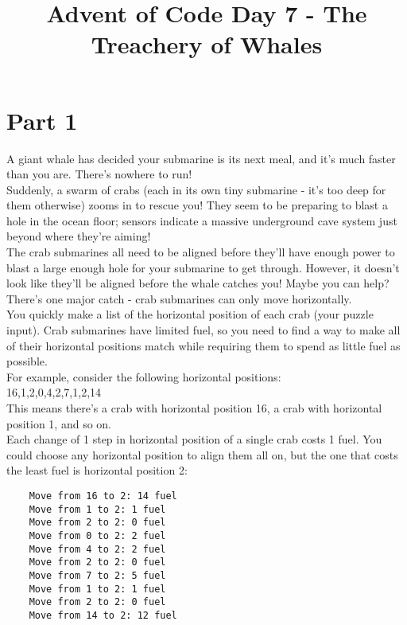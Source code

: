 \documentclass{article}
\title{Advent of Code Day 7 - The Treachery of Whales}
\begin{document}
\maketitle
\setlength{\parindent}{0ex}

\section{Part 1}
A giant whale has decided your submarine is its next meal, and it's much faster
than you are. There's nowhere to run!\\

Suddenly, a swarm of crabs (each in its own tiny submarine - it's too deep for
them otherwise) zooms in to rescue you! They seem to be preparing to blast a
hole in the ocean floor; sensors indicate a massive underground cave system just
beyond where they're aiming!\\

The crab submarines all need to be aligned before they'll have enough power to
blast a large enough hole for your submarine to get through. However, it doesn't
look like they'll be aligned before the whale catches you! Maybe you can help?\\

There's one major catch - crab submarines can only move horizontally.\\

You quickly make a list of the horizontal position of each crab (your puzzle
input). Crab submarines have limited fuel, so you need to find a way to make all
of their horizontal positions match while requiring them to spend as little fuel
as possible.\\

For example, consider the following horizontal positions:\\

16,1,2,0,4,2,7,1,2,14\\

This means there's a crab with horizontal position 16, a crab with horizontal
position 1, and so on.\\

Each change of 1 step in horizontal position of a single crab costs 1 fuel. You
could choose any horizontal position to align them all on, but the one that
costs the least fuel is horizontal position 2:\\
\begin{verbatim}
    Move from 16 to 2: 14 fuel
    Move from 1 to 2: 1 fuel
    Move from 2 to 2: 0 fuel
    Move from 0 to 2: 2 fuel
    Move from 4 to 2: 2 fuel
    Move from 2 to 2: 0 fuel
    Move from 7 to 2: 5 fuel
    Move from 1 to 2: 1 fuel
    Move from 2 to 2: 0 fuel
    Move from 14 to 2: 12 fuel
\end{verbatim}
\end{document}
